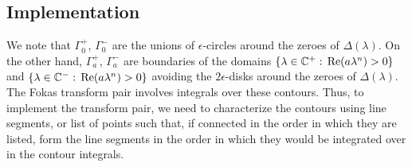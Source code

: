 \documentclass[11pt, oneside, a4paper]{article}
\begin{document}
\subsection{Implementation}
We note that $\Gamma_0^+$, $\Gamma_0^-$ are the unions of $\epsilon$-circles around the zeroes of $\Delta(\lambda)$. On the other hand, $\Gamma_a^+$, $\Gamma_a^-$ are boundaries of the domains $\{\lambda\in \mathbb C^+:\,\mathrm{Re}(a\lambda^n)>0\}$ and $\{\lambda\in \mathbb C^-:\,\mathrm{Re}(a\lambda^n)>0\}$ avoiding the $2\epsilon$-disks around the zeroes of $\Delta(\lambda)$. The Fokas transform pair involves integrals over these contours. Thus, to implement the transform pair, we need to characterize the contours using line segments, or list of points such that, if connected in the order in which they are listed, form the line segments in the order in which they would be integrated over in the contour integrals.
\end{document}
